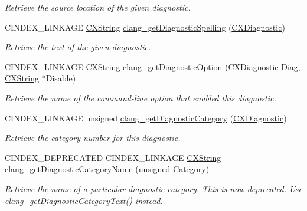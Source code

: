 \begin{DoxyCompactItemize}
\begin{DoxyCompactList}\small\item\em Retrieve the source location of the given diagnostic. \end{DoxyCompactList}\item 
\mbox{\label{group__CINDEX__DIAG_ga34a875e6d06ed4f8d2fc032f850ebbe1}} 
C\+I\+N\+D\+E\+X\+\_\+\+L\+I\+N\+K\+A\+GE \hyperlink{structCXString}{C\+X\+String} \hyperlink{group__CINDEX__DIAG_ga34a875e6d06ed4f8d2fc032f850ebbe1}{clang\+\_\+get\+Diagnostic\+Spelling} (\hyperlink{group__CINDEX__DIAG_ga44bb8aba7c40590ad25d1763c4fbff7f}{C\+X\+Diagnostic})
\begin{DoxyCompactList}\small\item\em Retrieve the text of the given diagnostic. \end{DoxyCompactList}\item 
C\+I\+N\+D\+E\+X\+\_\+\+L\+I\+N\+K\+A\+GE \hyperlink{structCXString}{C\+X\+String} \hyperlink{group__CINDEX__DIAG_ga69b094e2cca1cd6f452327dc9204a168}{clang\+\_\+get\+Diagnostic\+Option} (\hyperlink{group__CINDEX__DIAG_ga44bb8aba7c40590ad25d1763c4fbff7f}{C\+X\+Diagnostic} Diag, \hyperlink{structCXString}{C\+X\+String} $\ast$Disable)
\begin{DoxyCompactList}\small\item\em Retrieve the name of the command-\/line option that enabled this diagnostic. \end{DoxyCompactList}\item 
C\+I\+N\+D\+E\+X\+\_\+\+L\+I\+N\+K\+A\+GE unsigned \hyperlink{group__CINDEX__DIAG_ga0ec085bd59b8b6c935eab0e53a1f348f}{clang\+\_\+get\+Diagnostic\+Category} (\hyperlink{group__CINDEX__DIAG_ga44bb8aba7c40590ad25d1763c4fbff7f}{C\+X\+Diagnostic})
\begin{DoxyCompactList}\small\item\em Retrieve the category number for this diagnostic. \end{DoxyCompactList}\item 
C\+I\+N\+D\+E\+X\+\_\+\+D\+E\+P\+R\+E\+C\+A\+T\+ED C\+I\+N\+D\+E\+X\+\_\+\+L\+I\+N\+K\+A\+GE \hyperlink{structCXString}{C\+X\+String} \hyperlink{group__CINDEX__DIAG_gaf3d608c7860a57ce6571a3b03b4ead33}{clang\+\_\+get\+Diagnostic\+Category\+Name} (unsigned Category)
\begin{DoxyCompactList}\small\item\em Retrieve the name of a particular diagnostic category. This is now deprecated. Use \hyperlink{group__CINDEX__DIAG_ga6950702b6122f1cd74e1a369605a9f54}{clang\+\_\+get\+Diagnostic\+Category\+Text()} instead. \end{DoxyCompactList}\item 

\end{DoxyCompactItemize}
